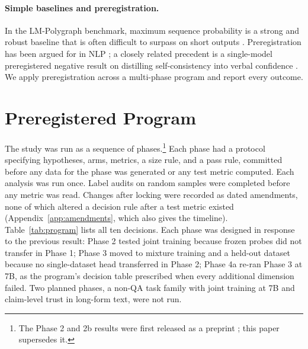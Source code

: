 \documentclass[10pt]{article}
\newif\ifanon
\begin{document}
\paragraph{Simple baselines and preregistration.} In the LM-Polygraph benchmark, maximum sequence probability is a strong and robust baseline that is often difficult to surpass on short outputs \citep{vashurin2025benchmarking}. Preregistration has been argued for in NLP \citep{vanmiltenburg-etal-2021-preregistering,sogaard-etal-2023-two}; a closely related precedent is a single-model preregistered negative result on distilling self-consistency into verbal confidence \citep{cacioli2026distilling}. We apply preregistration across a multi-phase program and report every outcome.

\section{Preregistered Program}
\label{sec:program}

The study was run as a sequence of phases.\ifanon\else\footnote{The Phase 2 and 2b results were first released as a preprint \citep{mohamed2026joint}; this paper supersedes it.}\fi{} Each phase had a protocol specifying hypotheses, arms, metrics, a size rule, and a pass rule, committed before any data for the phase was generated or any test metric computed. Each analysis was run once. Label audits on random samples were completed before any metric was read. Changes after locking were recorded as dated amendments, none of which altered a decision rule after a test metric existed (Appendix~\ref{app:amendments}, which also gives the timeline). Table~\ref{tab:program} lists all ten decisions. Each phase was designed in response to the previous result: Phase 2 tested joint training because frozen probes did not transfer in Phase 1; Phase 3 moved to mixture training and a held-out dataset because no single-dataset head transferred in Phase 2; Phase 4a re-ran Phase 3 at 7B, as the program's decision table prescribed when every additional dimension failed. Two planned phases, a non-QA task family with joint training at 7B and claim-level trust in long-form text, were not run.
\end{document}
